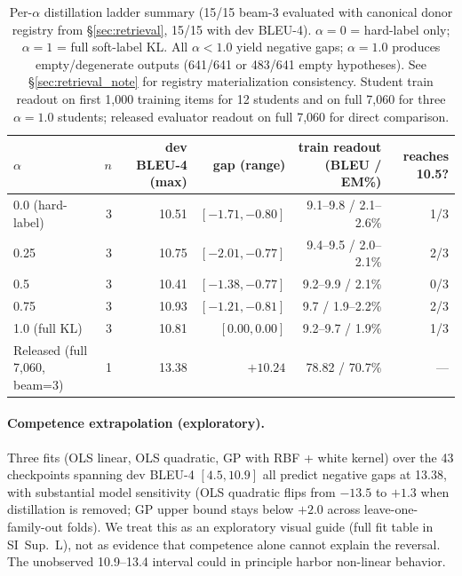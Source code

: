 \documentclass[pdflatex,sn-chicago]{sn-jnl}
\begin{document}
\begin{table}[h]
\centering
\scriptsize\setlength{\tabcolsep}{3pt}
\caption{Per-$\alpha$ distillation ladder summary (15/15 beam-3 evaluated with canonical donor registry from \S\ref{sec:retrieval}, 15/15 with dev BLEU-4). $\alpha{=}0$ = hard-label only; $\alpha{=}1$ = full soft-label KL. All $\alpha{<}1.0$ yield negative gaps; $\alpha{=}1.0$ produces empty/degenerate outputs (641/641 or 483/641 empty hypotheses). See \S\ref{sec:retrieval_note} for registry materialization consistency. Student train readout on first 1{,}000 training items for 12 students and on full 7{,}060 for three $\alpha{=}1.0$ students; released evaluator readout on full 7{,}060 for direct comparison.}
\label{tab:distill_alpha}
\begin{tabular}{lrrrrr}
\toprule
$\alpha$ & $n$ & dev BLEU-4 (max) & gap (range) & train readout (BLEU / EM\%) & reaches 10.5? \\
\midrule
0.0 (hard-label) & 3 & 10.51 & $[-1.71, -0.80]$ & 9.1--9.8 / 2.1--2.6\% & 1/3 \\
0.25 & 3 & 10.75 & $[-2.01, -0.77]$ & 9.4--9.5 / 2.0--2.1\% & 2/3 \\
0.5 & 3 & 10.41 & $[-1.38, -0.77]$ & 9.2--9.9 / 2.1\% & 0/3 \\
0.75 & 3 & 10.93 & $[-1.21, -0.81]$ & 9.7 / 1.9--2.2\% & 2/3 \\
1.0 (full KL) & 3 & 10.81 & $[0.00, 0.00]$ & 9.2--9.7 / 1.9\% & 1/3 \\
\midrule
Released (full 7{,}060, beam=3) & 1 & 13.38 & $+10.24$ & 78.82 / 70.7\% & --- \\
\bottomrule
\end{tabular}
\end{table}

\paragraph{Competence extrapolation (exploratory).}
\label{sec:extrapolation}
Three fits (OLS linear, OLS quadratic, GP with RBF + white kernel) over the 43 checkpoints spanning dev BLEU-4 $[4.5, 10.9]$ all predict negative gaps at 13.38, with substantial model sensitivity (OLS quadratic flips from $-13.5$ to $+1.3$ when distillation is removed; GP upper bound stays below $+2.0$ across leave-one-family-out folds). We treat this as an exploratory visual guide (full fit table in SI~Sup.~L), not as evidence that competence alone cannot explain the reversal. The unobserved 10.9--13.4 interval could in principle harbor non-linear behavior.
\end{document}
